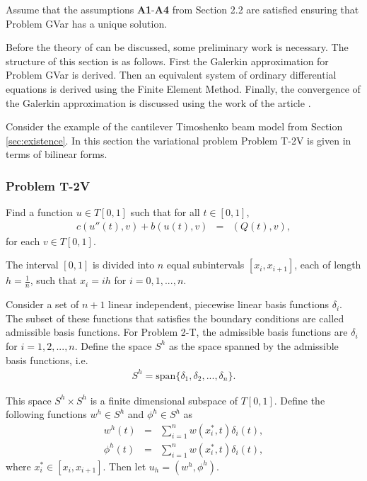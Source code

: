 \documentclass[../../main.tex]{subfiles}
\begin{document}
Assume that the assumptions \textbf{A1}-\textbf{A4} from Section 2.2 are
satisfied ensuring that Problem GVar has a unique solution.

Before the theory of \cite{BV13} can be discussed, some preliminary work is
necessary. The structure of this section is as follows. First the Galerkin
approximation for Problem GVar is derived. Then an equivalent system of
ordinary differential equations is derived using the Finite Element Method.
Finally, the convergence of the Galerkin approximation is discussed using the
work of the article \cite{BV13}.

Consider the example of the cantilever Timoshenko beam model from Section \ref{sec:existence}. In this section the variational problem Problem T-2V is given in terms of bilinear forms.

\subsubsection{Problem T-2V}
Find a function $u \in T[0,1]$ such that for all $t \in [0,1]$,
\begin{eqnarray*}
	c(u''(t),v) + b(u(t),v) & = & (Q(t),v),
\end{eqnarray*} for each $v \in T[0,1]$.

The interval $[0,1]$ is divided into $n$ equal subintervals $[x_{i}, x_{i+1}]$, each of length $\displaystyle h = \frac{1}{n}$, such that $x_i = ih$ for $i = 0,1,...,n$.

Consider a set of $n+1$ linear independent, piecewise linear basis functions $\delta_i$. The subset of these functions that satisfies the boundary conditions are called admissible basis functions. For Problem 2-T, the admissible basis functions are ${\delta_i}$ for $i = 1,2,...,n$. Define the space $S^h$ as the space spanned by the admissible basis functions, i.e.
\begin{eqnarray*}
	S^h = \textrm{span}\{\delta_1, \delta_2, ..., \delta_n\}.
\end{eqnarray*}

This space $S^h\times S^h$ is a finite dimensional subspace of $T[0,1]$. Define the following functions $w^h \in S^h$ and $\phi^h \in S^h$ as
\begin{eqnarray*}
	w^h(t) & = & \sum_{i=1}^{n} w(x_i^*,t) \delta_i(t),\\
	\phi^h(t) & = & \sum_{i=1}^{n} w(x_i^*,t) \delta_i(t),
\end{eqnarray*} where $x^*_i \in [x_i, x_{i+1}]$. Then let $u_h = (w^h, \phi^h )$.
\end{document}
